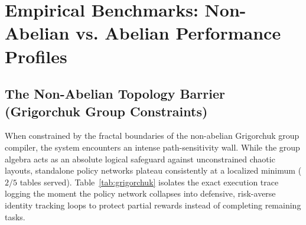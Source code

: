 \documentclass[11pt,journal,onecolumn]{IEEEtran}
\begin{document}
\section{Empirical Benchmarks: Non-Abelian vs. Abelian Performance Profiles}

\subsection{The Non-Abelian Topology Barrier (Grigorchuk Group Constraints)}
When constrained by the fractal boundaries of the non-abelian Grigorchuk group compiler, the system encounters an intense path-sensitivity wall. While the group algebra acts as an absolute logical safeguard against unconstrained chaotic layouts, standalone policy networks plateau consistently at a localized minimum ($2/5$ tables served). Table~\ref{tab:grigorchuk} isolates the exact execution trace logging the moment the policy network collapses into defensive, risk-averse identity tracking loops to protect partial rewards instead of completing remaining tasks.
\end{document}
